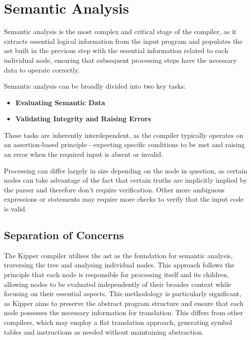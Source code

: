 \section{Semantic Analysis}
\label{sec:semantic-analysis}

Semantic analysis is the most complex and critical stage of the compiler, as it extracts essential logical information from the input program and populates the \Gls{ast} built in the previous step with the essential information related to each individual node, ensuring that subsequent processing steps have the necessary data to operate correctly.

Semantic analysis can be broadly divided into two key tasks:

\begin{itemize}
	\item \textbf{Evaluating Semantic Data}
	\item \textbf{Validating Integrity and Raising Errors}
\end{itemize}

These tasks are inherently interdependent, as the compiler typically operates on an assertion-based principle—expecting specific conditions to be met and raising an error when the required input is absent or invalid.

Processing can differ largely in size depending on the node in question, as certain nodes can take advantage of the fact that certain truths are implicitly implied by the parser and therefore don't require verification. Other more ambiguous expressions or statements may require more checks to verify that the input code is valid.

\subsection{Separation of Concerns}
\label{sec:separation-of-concerns}

The Kipper compiler utilises the \acrshort{ast} as the foundation for semantic analysis, traversing the tree and analysing individual nodes. This approach follows the principle that each node is responsible for processing itself and its children, allowing nodes to be evaluated independently of their broader context while focusing on their essential aspects. This methodology is particularly significant, as Kipper aims to preserve the abstract program structure and ensure that each node possesses the necessary information for translation. This differs from other compilers, which may employ a flat translation approach, generating symbol tables and instructions as needed without maintaining abstraction.

